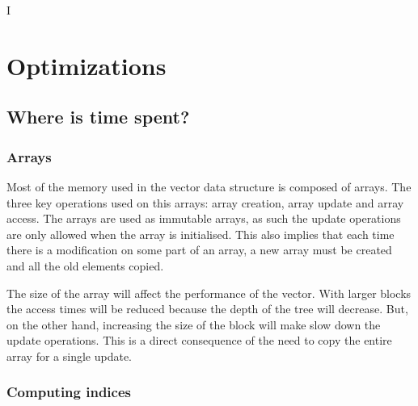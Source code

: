 I%

\chapter{Optimizations} %

\label{Optimizations} %



\section{Where is time spent?}


\subsection{Arrays}
Most of the memory used in the vector data structure is composed of arrays. The three key operations used on this arrays: array creation, array update and array access. The arrays are used as immutable arrays, as such the update operations are only allowed when the array is initialised. This also implies that each time there is a modification on some part of an array, a new array must be created and all the old elements copied. 

The size of the array will affect the performance of the vector. With larger blocks the access times will be reduced because the depth of the tree will decrease. But, on the other hand, increasing the size of the block will make slow down the update operations. This is a direct consequence of the need to copy the entire array for a single update.



\subsection{Computing indices}
\label{ComputingIndices}


